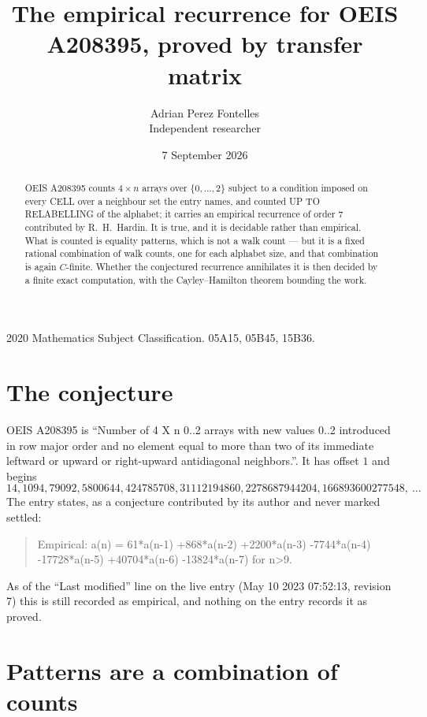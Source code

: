 \documentclass[11pt,a4paper]{article}
\title{The empirical recurrence for OEIS A208395, proved by transfer matrix}
\author{Adrian Perez Fontelles\\ \small Independent researcher}
\date{7 September 2026}
\theoremstyle{plain}
\theoremstyle{definition}
\begin{document}
\maketitle

\begin{abstract}
OEIS A208395 counts $4\times n$ arrays over $\{0,\dots,2\}$ subject to a condition imposed on
every CELL over a neighbour set the entry names, and counted UP TO RELABELLING of the
alphabet; it carries an empirical recurrence of order $7$ contributed by
R.~H.~Hardin. It is true, and it is decidable rather than empirical. What is counted is
equality patterns, which is not a walk count --- but it is a fixed rational combination of
walk counts, one for each alphabet size, and that combination is again $C$-finite. Whether the
conjectured recurrence annihilates it is then decided by a finite exact computation, with the
Cayley--Hamilton theorem bounding the work.
\end{abstract}

\noindent\small 2020 Mathematics Subject Classification. 05A15, 05B45, 15B36.\normalsize

\section{The conjecture}

OEIS A208395 is ``Number of 4 X n 0..2 arrays with new values 0..2 introduced in row major order and no element equal to more than two of its immediate leftward or upward or right-upward antidiagonal neighbors.''. It has offset $1$ and begins
\[
14, 1094, 79092, 5800644, 424785708, 31112194860, 2278687944204, 166893600277548,\ \dots
\]
The entry states, as a conjecture contributed by its author and never marked settled:
\begin{quote}
Empirical: a(n) = 61*a(n-1) +868*a(n-2) +2200*a(n-3) -7744*a(n-4) -17728*a(n-5) +40704*a(n-6) -13824*a(n-7) for n>9.
\end{quote}
As of the ``Last modified'' line on the live entry (May 10 2023 07:52:13, revision 7) this is still
recorded as empirical, and nothing on the entry records it as proved.

\section{Patterns are a combination of counts}
\end{document}
